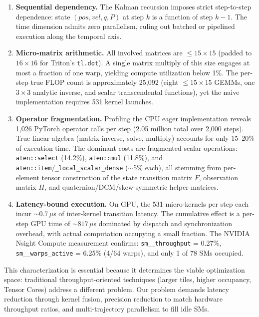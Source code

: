 \documentclass[pdflatex,sn-mathphys-num]{sn-jnl}%
\theoremstyle{thmstyleone}%
\theoremstyle{thmstyletwo}%
\theoremstyle{thmstylethree}%
\begin{document}
\begin{enumerate}
\item \textbf{Sequential dependency.} The Kalman recursion imposes strict step-to-step dependence: state $(pos, vel, q, P)$ at step $k$ is a function of step $k-1$. The time dimension admits zero parallelism, ruling out batched or pipelined execution along the temporal axis.

\item \textbf{Micro-matrix arithmetic.} All involved matrices are $\leq 15\times15$ (padded to $16\times16$ for Triton's \texttt{tl.dot}). A single matrix multiply of this size engages at most a fraction of one warp, yielding compute utilization below 1\%. The per-step true FLOP count is approximately 25,092 (eight $\leq 15\times15$ GEMMs, one $3\times3$ analytic inverse, and scalar transcendental functions), yet the naive implementation requires 531 kernel launches.

\item \textbf{Operator fragmentation.} Profiling the CPU eager implementation reveals 1,026 PyTorch operator calls per step (2.05 million total over 2,000 steps). True linear algebra (matrix inverse, solve, multiply) accounts for only 15--20\% of execution time. The dominant costs are fragmented scalar operations: \texttt{aten::select} (14.2\%), \texttt{aten::mul} (11.8\%), and \texttt{aten::item}/\texttt{\_local\_scalar\_dense} ($\sim$5\% each), all stemming from per-element tensor construction of the state transition matrix $F$, observation matrix $H$, and quaternion/DCM/skew-symmetric helper matrices.

\item \textbf{Latency-bound execution.} On GPU, the 531 micro-kernels per step each incur $\sim 0.7\,\mu$s of inter-kernel transition latency. The cumulative effect is a per-step GPU time of $\sim 817\,\mu$s dominated by dispatch and synchronization overhead, with actual computation occupying a small fraction. The NVIDIA Nsight Compute measurement confirms: \texttt{sm\_\_throughput} = 0.27\%, \texttt{sm\_\_warps\_active} = 6.25\% (4/64 warps), and only 1 of 78 SMs occupied.
\end{enumerate}

This characterization is essential because it determines the viable optimization space: traditional throughput-oriented techniques (larger tiles, higher occupancy, Tensor Cores) address a different problem. Our problem demands latency reduction through kernel fusion, precision reduction to match hardware throughput ratios, and multi-trajectory parallelism to fill idle SMs.
\end{document}
